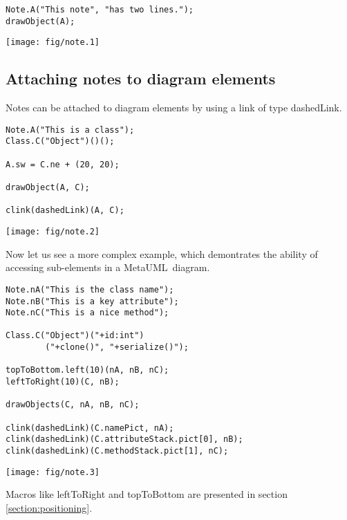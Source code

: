 \documentclass{article}
\newcommand{\code}{\ttfamily}
\newcommand{\metauml}{MetaUML}
\begin{document}
\begin{multicols}{2}
\begin{verbatim}
Note.A("This note", "has two lines.");
drawObject(A);
\end{verbatim}
\columnbreak
\hspace{3cm}\texttt{[image: fig/note.1]}
\end{multicols}

\subsection{Attaching notes to diagram elements}

Notes can be attached to diagram elements by using a link of type {\code dashedLink}.

\begin{multicols}{2}
\begin{verbatim}
Note.A("This is a class");
Class.C("Object")()();

A.sw = C.ne + (20, 20);

drawObject(A, C);

clink(dashedLink)(A, C);
\end{verbatim}
\columnbreak
\hspace{1cm}\texttt{[image: fig/note.2]}
\end{multicols}

Now let us see a more complex example, which demontrates the ability of accessing sub-elements in a \metauml\ diagram.
\pagebreak

\begin{multicols}{2}
\begin{verbatim}
Note.nA("This is the class name");
Note.nB("This is a key attribute");
Note.nC("This is a nice method");

Class.C("Object")("+id:int")
        ("+clone()", "+serialize()");

topToBottom.left(10)(nA, nB, nC);
leftToRight(10)(C, nB);

drawObjects(C, nA, nB, nC);

clink(dashedLink)(C.namePict, nA); 
clink(dashedLink)(C.attributeStack.pict[0], nB); 
clink(dashedLink)(C.methodStack.pict[1], nC);
\end{verbatim}
\columnbreak
\hspace{1cm}\texttt{[image: fig/note.3]}
\end{multicols}

Macros like {\code leftToRight} and {\code topToBottom} are presented in section \ref{section:positioning}.
\end{document}
